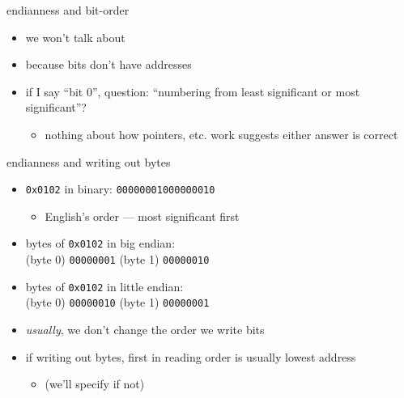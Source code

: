 \begin{frame}{endianness and bit-order}
    \begin{itemize}
    \item we won't talk about 
    \item because bits don't have addresses
    \vspace{.5cm}
    \item if I say ``bit $0$'', question: ``numbering from least significant or most significant''?
        \begin{itemize}
        \item nothing about how pointers, etc. work suggests either answer is correct
        \end{itemize}
    \end{itemize}
\end{frame}

\begin{frame}{endianness and writing out bytes}
    \begin{itemize}
        \item \texttt{0x0102} in binary: \texttt{00000001000000010}
            \begin{itemize}
            \item English's order --- most significant first
            \end{itemize}
        \item bytes of \texttt{0x0102} in big endian: \\(byte 0) \texttt{00000001} (byte 1) \texttt{00000010}
        \item bytes of \texttt{0x0102} in little endian: \\(byte 0) \texttt{00000010} (byte 1) \texttt{00000001}
        \vspace{.5cm}
        \item \textit{usually}, we don't change the order we write bits
        \item if writing out bytes, first in reading order is usually lowest address
            \begin{itemize}
            \item (we'll specify if not)
            \end{itemize}
    \end{itemize}
\end{frame}

